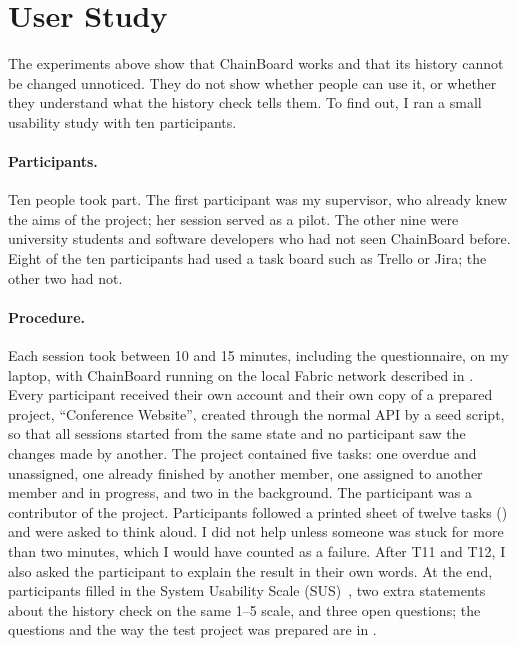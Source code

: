 
\section{User Study}
\label{sec:results-usability}

The experiments above show that ChainBoard works and that its history cannot be changed unnoticed. They do not show whether people can use it, or whether they understand what the history check tells them. To find out, I ran a small usability study with ten participants.

\paragraph*{Participants.} Ten people took part. The first participant was my supervisor, who already knew the aims of the project; her session served as a pilot. The other nine were university students and software developers who had not seen ChainBoard before. Eight of the ten participants had used a task board such as Trello or Jira; the other two had not.

\paragraph*{Procedure.} Each session took between 10 and 15 minutes, including the questionnaire, on my laptop, with ChainBoard running on the local Fabric network described in . Every participant received their own account and their own copy of a prepared project, ``Conference Website'', created through the normal API by a seed script, so that all sessions started from the same state and no participant saw the changes made by another. The project contained five tasks: one overdue and unassigned, one already finished by another member, one assigned to another member and in progress, and two in the background. The participant was a contributor of the project. Participants followed a printed sheet of twelve tasks () and were asked to think aloud. I did not help unless someone was stuck for more than two minutes, which I would have counted as a failure. After T11 and T12, I also asked the participant to explain the result in their own words. At the end, participants filled in the System Usability Scale (SUS)~\cite{brooke1996sus}, two extra statements about the history check on the same 1--5 scale, and three open questions; the questions and the way the test project was prepared are in .

